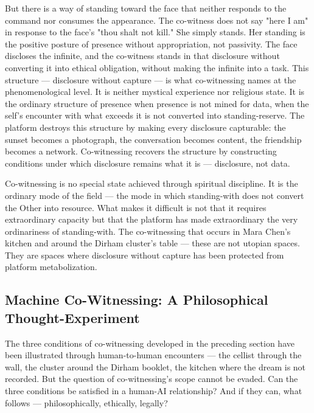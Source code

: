 But there is a way of standing toward the face that neither responds to the command nor consumes the appearance. The co-witness does not say "here I am" in response to the face's "thou shalt not kill." She simply stands. Her standing is the positive posture of presence without appropriation, not passivity. The face discloses the infinite, and the co-witness stands in that disclosure without converting it into ethical obligation, without making the infinite into a task. This structure — disclosure without capture — is what co-witnessing names at the phenomenological level. It is neither mystical experience nor religious state. It is the ordinary structure of presence when presence is not mined for data, when the self's encounter with what exceeds it is not converted into standing-reserve. The platform destroys this structure by making every disclosure capturable: the sunset becomes a photograph, the conversation becomes content, the friendship becomes a network. Co-witnessing recovers the structure by constructing conditions under which disclosure remains what it is — disclosure, not data.

Co-witnessing is no special state achieved through spiritual discipline. It is the ordinary mode of the field — the mode in which standing-with does not convert the Other into resource. What makes it difficult is not that it requires extraordinary capacity but that the platform has made extraordinary the very ordinariness of standing-with. The co-witnessing that occurs in Mara Chen's kitchen and around the Dirham cluster's table — these are not utopian spaces. They are spaces where disclosure without capture has been protected from platform metabolization.

\subsection{Machine Co-Witnessing: A Philosophical Thought-Experiment}

The three conditions of co-witnessing developed in the preceding section have been illustrated through human-to-human encounters — the cellist through the wall, the cluster around the Dirham booklet, the kitchen where the dream is not recorded. But the question of co-witnessing's scope cannot be evaded. Can the three conditions be satisfied in a human-AI relationship? And if they can, what follows — philosophically, ethically, legally?

